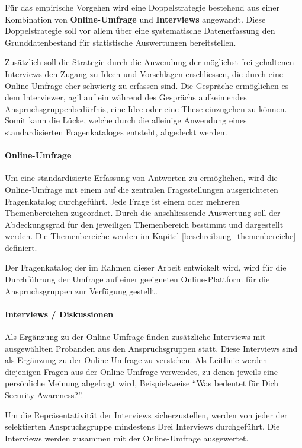 \documentclass[../../main.tex]{subfiles}
\begin{document}
\begin{sloppypar}
Für das empirische Vorgehen wird eine Doppelstrategie bestehend aus einer Kombination von \textbf{Online-Umfrage} und \textbf{Interviews} angewandt. Diese Doppelstrategie soll vor allem über eine systematische Datenerfassung den Grunddatenbestand für statistische Auswertungen bereitstellen.

Zusätzlich soll die Strategie durch die Anwendung der möglichst frei gehaltenen Interviews den Zugang zu Ideen und Vorschlägen erschliessen, die durch eine Online-Umfrage eher schwierig zu erfassen sind. Die Gespräche ermöglichen es dem Interviewer, agil auf ein während des Gesprächs aufkeimendes Anspruchsgruppenbedürfnis, eine Idee oder eine These einzugehen zu können. Somit kann die Lücke, welche durch die alleinige Anwendung eines standardisierten Fragenkataloges entsteht, abgedeckt werden.
\end{sloppypar}

\paragraph*{Online-Umfrage}\mbox{}

\begin{sloppypar}
Um eine standardisierte Erfassung von Antworten zu ermöglichen, wird die Online-Umfrage mit einem auf die zentralen Fragestellungen ausgerichteten Fragenkatalog durchgeführt. Jede Frage ist einem oder mehreren Themenbereichen zugeordnet. Durch die anschliessende Auswertung soll der Abdeckungsgrad für den jeweiligen Themenbereich bestimmt und dargestellt werden. Die Themenbereiche werden im Kapitel \ref{beschreibung_themenbereiche} definiert.

Der Fragenkatalog der im Rahmen dieser Arbeit entwickelt wird, wird für die Durchführung der Umfrage auf einer geeigneten Online-Plattform für die Anspruchsgruppen zur Verfügung gestellt.
\end{sloppypar}

\paragraph*{Interviews / Diskussionen}\mbox{}

\begin{sloppypar}
Als Ergänzung zu der Online-Umfrage finden zusätzliche Interviews mit ausgewählten Probanden aus den Anspruchsgruppen statt. Diese Interviews sind als Ergänzung zu der Online-Umfrage zu verstehen. Als Leitlinie werden diejenigen Fragen aus der Online-Umfrage verwendet, zu denen jeweils eine persönliche Meinung abgefragt wird, Beispielsweise "`Was bedeutet für Dich Security Awareness?"'.

Um die Repräsentativität der Interviews sicherzustellen, werden von jeder der selektierten Anspruchsgruppe mindestens Drei Interviews durchgeführt. Die Interviews werden zusammen mit der Online-Umfrage ausgewertet.

\end{sloppypar}
\end{document}
